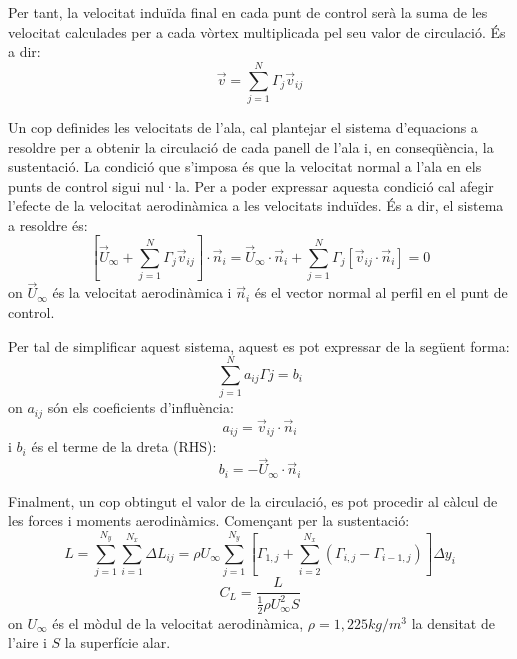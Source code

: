Per tant, la velocitat induïda final en cada punt de control serà la suma de les velocitat calculades per a cada vòrtex multiplicada pel seu valor de circulació. És a dir:
\begin{equation}
\vec{v}=\sum_{j=1}^{N}\Gamma_{j}\vec{v}_{ij}
\end{equation}

Un cop definides les velocitats de l'ala, cal plantejar el sistema d'equacions a resoldre per a obtenir la circulació de cada panell de l'ala i, en conseqüència, la sustentació. La condició que s'imposa és que la velocitat normal a l'ala en els punts de control sigui nul·la. Per a poder expressar aquesta condició cal afegir l'efecte de la velocitat aerodinàmica a les velocitats induïdes. És a dir, el sistema a resoldre és:
\begin{equation}
\left[\vec{U}_{\infty}+\sum_{j=1}^{N}\Gamma_{j}\vec{v}_{ij}\right]\cdot\vec{n}_{i}=\vec{U}_{\infty}\cdot\vec{n}_{i}+\sum_{j=1}^{N}\Gamma_{j}\left[\vec{v}_{ij}\cdot\vec{n}_{i}\right]=0
\end{equation}
on $\vec{U}_{\infty}$ és la velocitat aerodinàmica i $\vec{n}_{i}$ és el vector normal al perfil en el punt de control.

Per tal de simplificar aquest sistema, aquest es pot expressar de la següent forma:
\begin{equation}
\sum_{j=1}^{N}a_{ij}\Gamma{j}=b_{i}
\end{equation}
on $a_{ij}$ són els coeficients d'influència:
\begin{equation}
a_{ij}=\vec{v}_{ij}\cdot\vec{n}_{i}
\end{equation}
i $b_{i}$ és el terme de la dreta (RHS):
\begin{equation}
b_{i}=-\vec{U}_{\infty}\cdot\vec{n}_{i}
\end{equation}

Finalment, un cop obtingut el valor de la circulació, es pot procedir al càlcul de les forces i moments aerodinàmics. Començant per la sustentació:
\begin{equation}
L=\sum_{j=1}^{N_{y}}\sum_{i=1}^{N_{x}}\Delta L_{ij}=\rho U_{\infty}\sum_{j=1}^{N_{y}}\left[\Gamma_{1,j}+\sum_{i=2}^{N_{x}}\left(\Gamma_{i,j}-\Gamma_{i-1,j}\right)\right]\Delta y_{i}
\end{equation}
\begin{equation}
C_{L}=\frac{L}{\frac{1}{2}\rho U_{\infty}^{2}S}
\end{equation}
on $U_{\infty}$ és el mòdul de la velocitat aerodinàmica, $\rho=1,225 kg/m^{3}$ la densitat de l'aire i $S$ la superfície alar.

